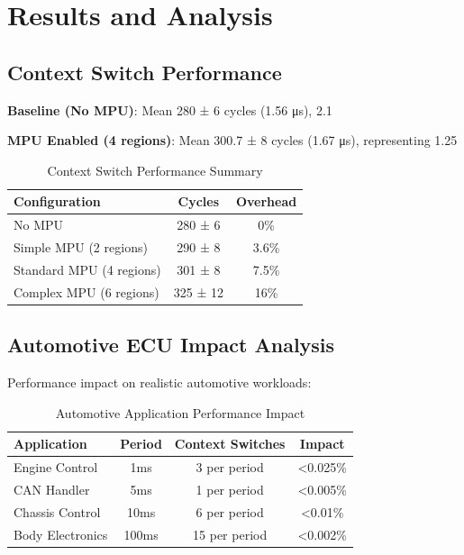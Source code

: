 \chapter{Results and Analysis}
\label{sec:results}

\section{Context Switch Performance}

\textbf{Baseline (No MPU)}: Mean 280 ± 6 cycles (1.56 μs), 2.1%

\textbf{MPU Enabled (4 regions)}: Mean 300.7 ± 8 cycles (1.67 μs), representing 1.25%

\begin{table}[h]
\centering
\caption{Context Switch Performance Summary}
\begin{tabular}{@{}lcc@{}}
\toprule
Configuration & Cycles & Overhead \\
\midrule
No MPU & 280 ± 6 & 0\% \\
Simple MPU (2 regions) & 290 ± 8 & 3.6\% \\
Standard MPU (4 regions) & 301 ± 8 & 7.5\% \\
Complex MPU (6 regions) & 325 ± 12 & 16\% \\
\bottomrule
\end{tabular}
\end{table}

\section{Automotive ECU Impact Analysis}

Performance impact on realistic automotive workloads:

\begin{table}[h]
\centering
\caption{Automotive Application Performance Impact}
\begin{tabular}{@{}lccc@{}}
\toprule
Application & Period & Context Switches & Impact \\
\midrule
Engine Control & 1ms & 3 per period & <0.025\% \\
CAN Handler & 5ms & 1 per period & <0.005\% \\
Chassis Control & 10ms & 6 per period & <0.01\% \\
Body Electronics & 100ms & 15 per period & <0.002\% \\
\bottomrule
\end{tabular}
\end{table}

